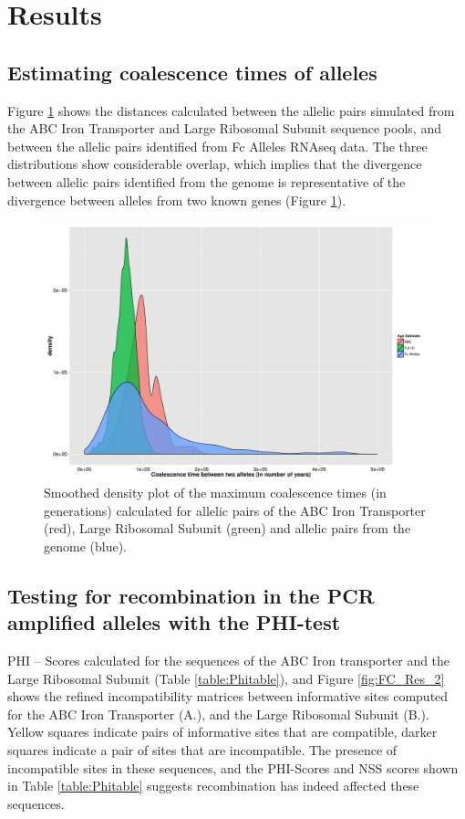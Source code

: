 \section{Results}

\subsection{Estimating coalescence times of alleles}

Figure \ref{fig:FC_Res_1} shows the distances calculated between the allelic pairs simulated from the ABC Iron Transporter and Large Ribosomal Subunit sequence pools, and between the allelic pairs identified from Fc Alleles RNAseq data.
The three distributions show considerable overlap, which implies that the divergence between allelic pairs identified from the genome is representative of the divergence between alleles from two known genes (Figure \ref{fig:FC_Res_1}).

\begin{figure}
\centering
\includegraphics{Figures/Fcylindrus/DatesComparrisonMax}
\caption{Smoothed density plot of the maximum coalescence times (in generations) calculated for allelic pairs of the ABC Iron Transporter (red), Large Ribosomal Subunit (green) and allelic pairs from the genome (blue).\label{fig:FC_Res_1}}
\end{figure}

\subsection{Testing for recombination in the PCR amplified alleles with the PHI-test}

PHI – Scores calculated for the sequences of the ABC Iron transporter and the Large Ribosomal Subunit (Table \ref{table:Phitable}), and Figure \ref{fig:FC_Res_2} shows the refined incompatibility matrices between informative sites computed for the ABC Iron Transporter (A.), and the Large Ribosomal Subunit (B.). 
Yellow squares indicate pairs of informative sites that are compatible, darker squares indicate a pair of sites that are incompatible.
The presence of incompatible sites in these sequences, and the PHI-Scores and NSS scores shown in Table \ref{table:Phitable} suggests recombination has indeed affected these sequences.

